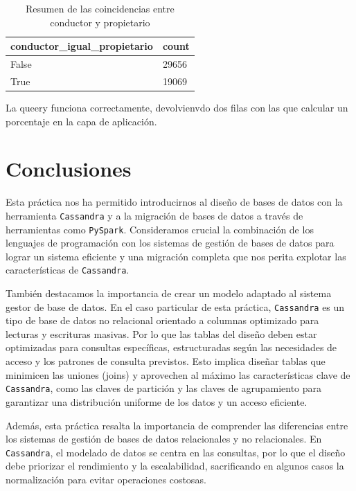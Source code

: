 \documentclass[]{article}
\begin{document}
\begin{itemize}
\begin{table}[H]
\begin{longtable}{l l}
    \hline
    \textbf{conductor\_igual\_propietario} & \textbf{count} \\ \hline
    \endhead
    
    False & 29656 \\ \hline
    True & 19069 \\ \hline
    
\end{longtable}
\caption{Resumen de las coincidencias entre conductor y propietario}
\end{table}

La queery funciona correctamente, devolvienvdo dos filas con las que calcular un porcentaje en la capa de aplicación.

\end{itemize}

\newpage
\section{Conclusiones}

Esta práctica nos ha permitido introducirnos al diseño de bases de datos con la
herramienta \verb!Cassandra! y a la migración de bases de datos a través de
herramientas como \verb!PySpark!. Consideramos crucial la combinación de los
lenguajes de programación con los sistemas de gestión de bases de datos para
lograr un sistema eficiente y una migración completa que nos perita explotar
las características de \verb!Cassandra!.

También destacamos la importancia de crear un modelo adaptado al sistema gestor
de base de datos. En el caso particular de esta práctica, \verb!Cassandra! es
un tipo de base de datos no relacional orientado a columnas optimizado para
lecturas y escrituras masivas. Por lo que las tablas del diseño deben estar
optimizadas para consultas específicas, estructuradas según las necesidades de
acceso y los patrones de consulta previstos. Esto implica diseñar tablas que
minimicen las uniones (joins) y aprovechen al máximo las características clave
de \verb!Cassandra!, como las claves de partición y las claves de agrupamiento
para garantizar una distribución uniforme de los datos y un acceso eficiente.

Además, esta práctica resalta la importancia de comprender las diferencias
entre los sistemas de gestión de bases de datos relacionales y no relacionales.
En \verb!Cassandra!, el modelado de datos se centra en las consultas, por lo
que el diseño debe priorizar el rendimiento y la escalabilidad, sacrificando en
algunos casos la normalización para evitar operaciones costosas.
\end{document}
